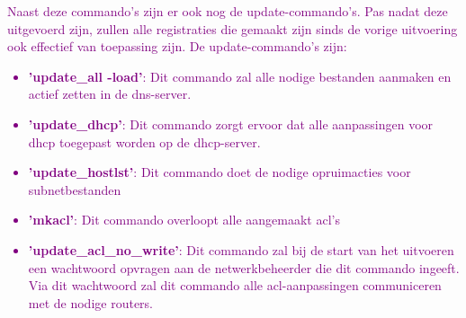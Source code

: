\textcolor{purple}{Naast deze commando's zijn er ook nog de update-commando's. Pas nadat deze uitgevoerd zijn, zullen alle registraties die gemaakt zijn sinds de vorige uitvoering ook effectief van toepassing zijn. De update-commando's zijn:}
\textcolor{purple}{
    \begin{itemize}
        \item \textbf{'update\_all -load'}: Dit commando zal alle nodige bestanden aanmaken en actief zetten in de \acrshort{dns}-server.
        \item \textbf{'update\_dhcp'}: Dit commando zorgt ervoor dat alle aanpassingen voor \acrshort{dhcp} toegepast worden op de \acrshort{dhcp}-server.
        \item \textbf{'update\_hostlst'}: Dit commando doet de nodige opruimacties voor subnetbestanden
        \item \textbf{'mkacl'}: Dit commando overloopt alle aangemaakt \acrshort{acl}'s
        \item \textbf{'update\_acl\_no\_write'}: Dit commando zal bij de start van het uitvoeren een wachtwoord opvragen aan de netwerkbeheerder die dit commando ingeeft. Via dit wachtwoord zal dit commando alle \acrshort{acl}-aanpassingen communiceren met de nodige routers.
    \end{itemize}
}
